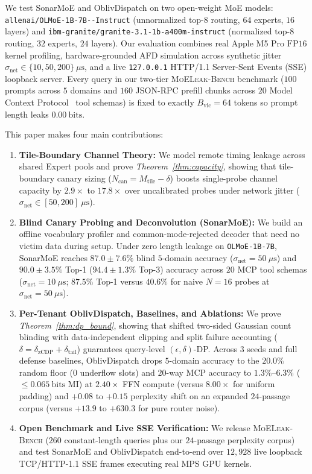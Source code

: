 \documentclass[11pt,a4paper]{article}
\renewcommand{\_}{\textunderscore\allowbreak}
\def\SM{SonarMoE}%
\def\OD{OblivDispatch}%
\theoremstyle{definition}
\theoremstyle{remark}
\newcommand{\SM}{\textsc{SonarMoE}}
\newcommand{\OD}{\textsc{OblivDispatch}}
\newcommand{\MLB}{\textsc{MoELeak-Bench}}
\begin{document}
We test \SM{} and \OD{} on two open-weight MoE models: \texttt{allenai/\allowbreak OLMoE-1B-7B--Instruct} (unnormalized $\text{top-}8$ routing, $64$ experts, $16$ layers) and \texttt{ibm-granite/\allowbreak granite-3.1-1b-\allowbreak a400m-instruct} (normalized $\text{top-}8$ routing, $32$ experts, $24$ layers). Our evaluation combines real Apple M5 Pro $\mathrm{FP16}$ kernel profiling, hardware-grounded AFD simulation across synthetic jitter $\sigma_{\mathrm{net}} \in \{10, 50, 200\}~\mu\mathrm{s}$, and a live \texttt{127.0.0.1} HTTP/1.1 Server-Sent Events (SSE) loopback server. Every query in our two-tier \MLB{} benchmark ($100$ prompts across $5$ domains and $160$ JSON-RPC prefill chunks across $20$ Model Context Protocol~\cite{anthropic2024mcp,patil2024bfcl} tool schemas) is fixed to exactly $B_{\mathrm{vic}} = 64$ tokens so prompt length leaks $0.00~\mathrm{bits}$.

This paper makes four main contributions:
\begin{enumerate}
  \item \textbf{Tile-Boundary Channel Theory:} We model remote timing leakage across shared Expert pools and prove \emph{Theorem~\ref{thm:capacity}}, showing that tile-boundary canary sizing ($N_{\mathrm{can}} = M_{\mathrm{tile}} - \delta$) boosts single-probe channel capacity by $2.9\times$ to $17.8\times$ over uncalibrated probes under network jitter ($\sigma_{\mathrm{net}} \in [50, 200]~\mu\mathrm{s}$).
  \item \textbf{Blind Canary Probing and Deconvolution (\SM{}):} We build an offline vocabulary profiler and common-mode-rejected decoder that need no victim data during setup. Under zero length leakage on \texttt{OLMoE-1B-7B}, \SM{} reaches $87.0 \pm 7.6\%$ blind $5$-domain accuracy ($\sigma_{\mathrm{net}} = 50~\mu\mathrm{s}$) and $90.0 \pm 3.5\%$ Top-1 ($94.4 \pm 1.3\%$ Top-3) accuracy across $20$ MCP tool schemas ($\sigma_{\mathrm{net}} = 10~\mu\mathrm{s}$; $87.5\%$ Top-1 versus $40.6\%$ for naive $N=16$ probes at $\sigma_{\mathrm{net}} = 50~\mu\mathrm{s}$).
  \item \textbf{Per-Tenant \OD{}, Baselines, and Ablations:} We prove \emph{Theorem~\ref{thm:dp_bound}}, showing that shifted two-sided Gaussian count blinding with data-independent clipping and split failure accounting ($\delta = \delta_{\mathrm{zCDP}} + \delta_{\mathrm{tail}}$) guarantees query-level $(\epsilon, \delta)$-DP. Across $3$ seeds and full defense baselines, \OD{} drops $5$-domain accuracy to the $20.0\%$ random floor ($0$ underflow slots) and $20$-way MCP accuracy to $1.3\%$--$6.3\%$ ($\le 0.065~\mathrm{bits}$ MI) at $2.40\times$ FFN compute (versus $8.00\times$ for uniform padding) and $+0.08$ to $+0.15$ perplexity shift on an expanded $24$-passage corpus (versus $+13.9$ to $+630.3$ for pure router noise).
  \item \textbf{Open Benchmark and Live SSE Verification:} We release \MLB{} ($260$ constant-length queries plus our $24$-passage perplexity corpus) and test \SM{} and \OD{} end-to-end over $12{,}928$ live loopback TCP/HTTP-1.1 SSE frames executing real MPS GPU kernels.
\end{enumerate}
\end{document}
